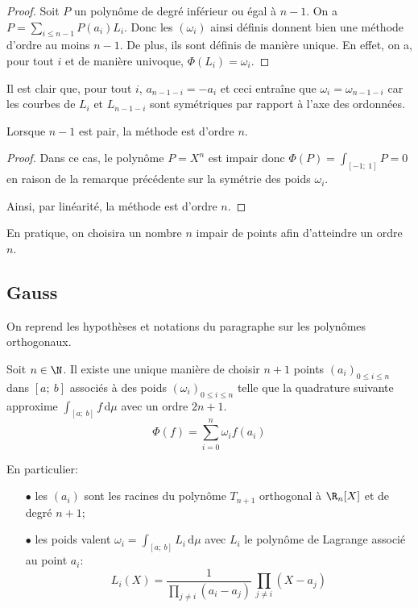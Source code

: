 \begin{proof}
Soit $P$ un polynôme de degré inférieur ou égal à $n-1$. On a $P = \displaystyle{\sum \limits_{i \leq n-1}} P(a_i) L_i$. Donc les $(\omega_i)$ ainsi définis donnent bien une méthode d'ordre au moins $n-1$. De plus, ils sont définis de manière unique. En effet, on a, pour tout $i$ et de manière univoque, $\Phi(L_i) = \omega_i$.
\end{proof}

\begin{listremarques}
\item
Il est clair que, pour tout $i$, $a_{n-1-i} = -a_i$ et ceci entraîne que $\omega_i = \omega_{n-1-i}$ car les courbes de $L_i$ et $L_{n-1-i}$ sont symétriques par rapport à l'axe des ordonnées.
\end{listremarques}

\begin{prop}
Lorsque $n-1$ est pair, la méthode est d'ordre $n$.
\end{prop}

\begin{proof}
Dans ce cas, le polynôme $P = X^n$ est impair donc $\Phi(P) = \displaystyle{\int_{[-1;~1]}} P = 0$ en raison de la remarque précédente sur la symétrie des poids $\omega_i$.

\medskip
Ainsi, par linéarité, la méthode est d'ordre $n$.
\end{proof}


\begin{listremarques}
\item
En pratique, on choisira un nombre $n$ impair de points afin d'atteindre un ordre $n$.
\end{listremarques}

\subsection{Gauss}

On reprend les hypothèses et notations du paragraphe sur les polynômes orthogonaux.

\begin{prop}
Soit $n \in \N$. Il existe une unique manière de choisir $n+1$ points $(a_i)_{0 \leq i \leq n}$ dans $[a;~b]$ associés à des poids $(\omega_i)_{0 \leq i \leq n}$ telle que la quadrature suivante approxime $\displaystyle{\int_{[a;~b]}} f \, \mathrm d \mu$ avec un ordre $2n+1$.
\[
\Phi(f) = \displaystyle{\sum_{i=0}^n} \omega_i f(a_i)
\]

En particulier:
\begin{itemize}
\item[$\bullet$] 
les $(a_i)$ sont les racines du polynôme $T_{n+1}$ orthogonal à $\R_n[X]$ et de degré $n+1$;
\item[$\bullet$] 
les poids valent $
\omega_i = \displaystyle{\int_{[a;~b]}} L_i \, \mathrm d \mu
$ avec $L_i$ le polynôme de Lagrange associé au point $a_i$:
\[
L_i(X) = \frac{1}{\displaystyle{\prod \limits_{j \neq i}} (a_i-a_j)} \, \displaystyle{\prod \limits_{j \neq i}} (X-a_j)
\]
\end{itemize} 
\end{prop}



